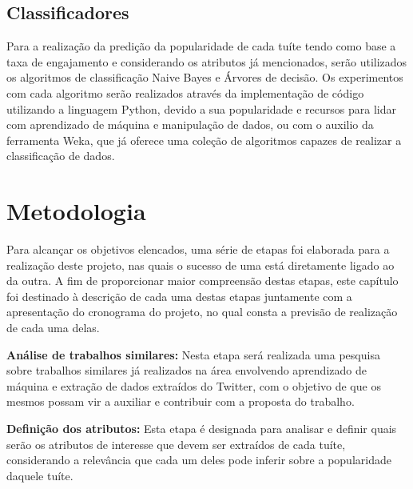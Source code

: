 \documentclass[oneside,openright,12pt]{ufsm_2015} %
\begin{document}
\section{Classificadores}
\label{sec:classificadores}

    \par Para a realização da predição da popularidade de cada tuíte tendo como base a taxa de engajamento e considerando os atributos já mencionados, serão utilizados os algoritmos de classificação Naive Bayes e Árvores de decisão. Os experimentos com cada algoritmo serão realizados através da implementação de código utilizando a linguagem Python, devido a sua popularidade e recursos para lidar com aprendizado de máquina e manipulação de dados, ou com o auxilio da ferramenta Weka, que já oferece uma coleção de algoritmos capazes de realizar a classificação de dados.


\chapter{Metodologia}
\label{sec:metodologia}

    \par Para alcançar os objetivos elencados, uma série de etapas foi elaborada para a realização deste projeto, nas quais o sucesso de uma está diretamente ligado ao da outra. A fim de proporcionar maior compreensão destas etapas, este capítulo foi destinado à descrição de cada uma destas etapas juntamente com a apresentação do cronograma do projeto, no qual consta a previsão de realização de cada uma delas.
    
    \par \textbf{Análise de trabalhos similares:} Nesta etapa será realizada uma pesquisa sobre trabalhos similares já realizados na área envolvendo aprendizado de máquina e extração de dados extraídos do Twitter, com o objetivo de que os mesmos possam vir a auxiliar e contribuir com a proposta do trabalho.
    
    \par \textbf{Definição dos atributos:} Esta etapa é designada para analisar e definir quais serão os atributos de interesse que devem ser extraídos de cada tuíte, considerando a relevância que cada um deles pode inferir sobre a popularidade daquele tuíte.
    
\end{document}
